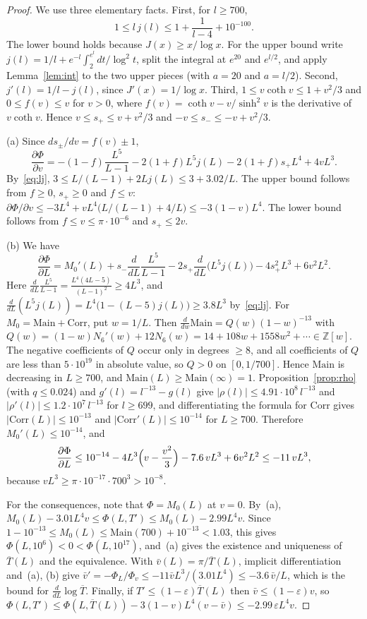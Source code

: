 \documentclass{amsart}
\theoremstyle{definition}
\theoremstyle{remark}
\theoremstyle{plain}
\numberwithin{equation}{section}
\newcommand{\eps}{\varepsilon}
\newcommand{\Main}{\mathrm{Main}}
\newcommand{\Corr}{\mathrm{Corr}}
\newcommand{\Tb}{\overline{T}}
\begin{document}
\begin{proof}
We use three elementary facts. First, for $l\ge700$,
\begin{equation}\label{eq:lj}
1\le l\,j(l)\le1+\frac{1}{l-4}+10^{-100}.
\end{equation}
The lower bound holds because $J(x)\ge x/\log x$. For the upper bound write $j(l)=1/l+e^{-l}\int_2^{e^l}dt/\log^2t$, split the integral at $e^{20}$ and $e^{l/2}$, and apply Lemma~\ref{lem:int} to the two upper pieces (with $a=20$ and $a=l/2$). Second, $j'(l)=1/l-j(l)$, since $J'(x)=1/\log x$. Third, $1\le v\coth v\le1+v^2/3$ and $0\le f(v)\le v$ for $v>0$, where $f(v)=\coth v-v/\sinh^2v$ is the derivative of $v\coth v$. Hence $v\le s_+\le v+v^2/3$ and $-v\le s_-\le-v+v^2/3$.

(a) Since $ds_\pm/dv=f(v)\pm1$,
\[
\frac{\partial\Phi}{\partial v}=-(1-f)\frac{L^5}{L-1}-2(1+f)L^5j(L)-2(1+f)s_+L^4+4vL^3.
\]
By~\eqref{eq:lj}, $3\le L/(L-1)+2Lj(L)\le3+3.02/L$. The upper bound follows from $f\ge0$, $s_+\ge0$ and $f\le v$: $\partial\Phi/\partial v\le-3L^4+vL^4\bigl(L/(L-1)+4/L\bigr)\le-3(1-v)L^4$. The lower bound follows from $f\le v\le\pi\cdot10^{-6}$ and $s_+\le2v$.

(b) We have
\[
\frac{\partial\Phi}{\partial L}=M_0'(L)+s_-\frac{d}{dL}\frac{L^5}{L-1}-2s_+\frac{d}{dL}\bigl(L^5j(L)\bigr)-4s_+^2L^3+6v^2L^2.
\]
Here $\frac{d}{dL}\frac{L^5}{L-1}=\frac{L^4(4L-5)}{(L-1)^2}\ge4L^3$, and $\frac{d}{dL}(L^5j(L))=L^4\bigl(1-(L-5)j(L)\bigr)\ge3.8L^3$ by~\eqref{eq:lj}. For $M_0=\Main+\Corr$, put $w=1/L$. Then $\frac{d}{dw}\Main=Q(w)(1-w)^{-13}$ with $Q(w)=(1-w)N_6'(w)+12N_6(w)=14+108w+1558w^2+\cdots\in\mathbb Z[w]$. The negative coefficients of $Q$ occur only in degrees $\ge8$, and all coefficients of $Q$ are less than $5\cdot10^{19}$ in absolute value, so $Q>0$ on $[0,1/700]$. Hence $\Main$ is decreasing in $L\ge700$, and $\Main(L)\ge\Main(\infty)=1$. Proposition~\ref{prop:rho} (with $q\le0.024$) and $g'(l)=l^{-13}-g(l)$ give $|\rho(l)|\le4.91\cdot10^8\,l^{-13}$ and $|\rho'(l)|\le1.2\cdot10^7\,l^{-13}$ for $l\ge699$, and differentiating the formula for $\Corr$ gives $|\Corr(L)|\le10^{-13}$ and $|\Corr'(L)|\le10^{-14}$ for $L\ge700$. Therefore $M_0'(L)\le10^{-14}$, and
\[
\frac{\partial\Phi}{\partial L}\le10^{-14}-4L^3\Bigl(v-\frac{v^2}{3}\Bigr)-7.6\,vL^3+6v^2L^2\le-11\,vL^3,
\]
because $vL^3\ge\pi\cdot10^{-17}\cdot700^3>10^{-8}$.

For the consequences, note that $\Phi=M_0(L)$ at $v=0$. By~(a), $M_0(L)-3.01L^4v\le\Phi(L,T')\le M_0(L)-2.99L^4v$. Since $1-10^{-13}\le M_0(L)\le\Main(700)+10^{-13}<1.03$, this gives $\Phi(L,10^6)<0<\Phi(L,10^{17})$, and~(a) gives the existence and uniqueness of $\Tb(L)$ and the equivalence. With $\bar v(L)=\pi/\Tb(L)$, implicit differentiation and~(a), (b) give $\bar v'=-\Phi_L/\Phi_v\le-11\bar vL^3/(3.01L^4)\le-3.6\,\bar v/L$, which is the bound for $\frac{d}{dL}\log\Tb$. Finally, if $T'\le(1-\eps)\Tb(L)$ then $\bar v\le(1-\eps)v$, so $\Phi(L,T')\le\Phi(L,\Tb(L))-3(1-v)L^4(v-\bar v)\le-2.99\,\eps L^4v$.
\end{proof}
\end{document}
